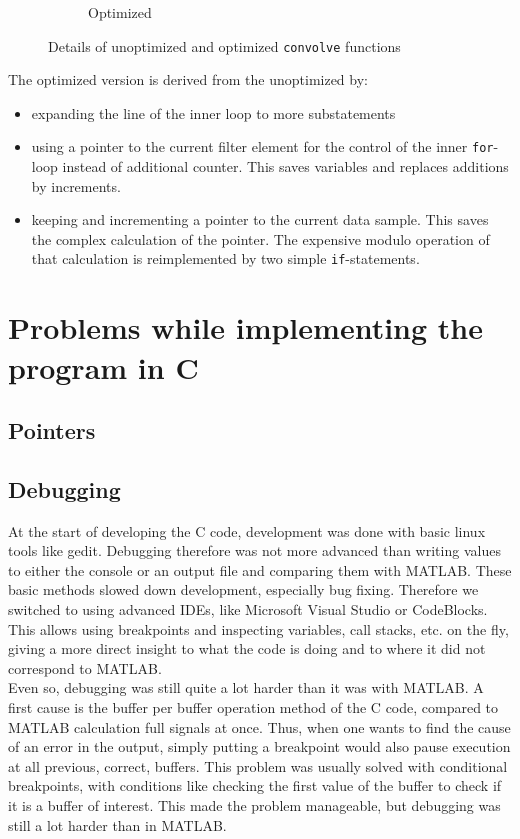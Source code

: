 \documentclass[a4paper]{article}
\begin{document}
\begin{figure}[htpb]
{\begin{subfigure}[c]{.7\textwidth}
\caption{Optimized}
\end{subfigure}
}
\caption{Details of unoptimized and optimized \texttt{convolve} functions}
\label{fig:convolvefunctions}
\end{figure}
\begin{minipage}{\textwidth}
The optimized version is derived from the unoptimized by:
\begin{itemize}
\item expanding the line of the inner loop to more substatements
\item using a pointer to the current filter element for the control of the inner \texttt{for}-loop instead of additional counter. This saves variables and replaces additions by increments.
\item keeping and incrementing a pointer to the current data sample. This saves the complex calculation of the pointer. The expensive modulo operation of that calculation is reimplemented by two simple \texttt{if}-statements.
\end{itemize}
\end{minipage}
\section{Problems while implementing the program in C}
\subsection{Pointers}
\subsection{Debugging}
At the start of developing the C code, development was done with basic linux tools like gedit. Debugging therefore was not more advanced than writing values to either the console or an output file and comparing them with MATLAB. These basic methods slowed down development, especially bug fixing. Therefore we switched to using advanced IDEs, like Microsoft Visual Studio or CodeBlocks. This allows using breakpoints and inspecting variables, call stacks, etc. on the fly, giving a more direct insight to what the code is doing and to where it did not correspond to MATLAB. \\

Even so, debugging was still quite a lot harder than it was with MATLAB. A first cause is the buffer per buffer operation method of the C code, compared to MATLAB calculation full signals at once. Thus, when one wants to find the cause of an error in the output, simply putting a breakpoint would also pause execution at all previous, correct, buffers. This problem was usually solved with conditional breakpoints, with conditions like checking the first value of the buffer to check if it is a buffer of interest. This made the problem manageable, but debugging was still a lot harder than in MATLAB.\\
\end{document}

